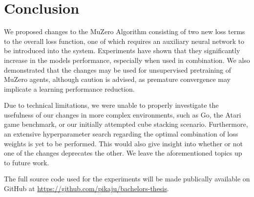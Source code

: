 \section{Conclusion}
We proposed changes to the MuZero Algorithm consisting of two new loss terms to the overall loss function, one of which requires an auxiliary neural network to be introduced into the system. Experiments have shown that they significantly increase in the models performance, especially when used in combination. We also demonstrated that the changes may be used for unsupervised pretraining of MuZero agents, although caution is advised, as premature convergence may implicate a learning performance reduction.

Due to technical limitations, we were unable to properly investigate the usefulness of our changes in more complex environments, such as Go, the Atari game benchmark, or our initially attempted cube stacking scenario. Furthermore, an extensive hyperparameter search regarding the optimal combination of loss weights is yet to be performed. This would also give insight into whether or not one of the changes deprecates the other. We leave the aforementioned topics up to future work.

The full source code used for the experiments will be made publically available on GitHub at \url{https://github.com/pikaju/bachelors-thesis}.
